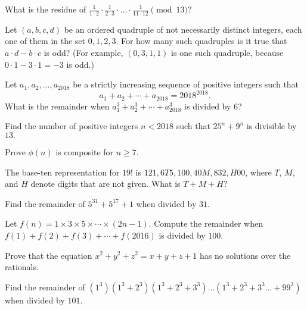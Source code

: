 \documentclass[mast]{lucky}
\begin{document}
\begin{prob}[]{2}
What is the residue of $\frac{1}{1\cdot 2}\cdot \frac{1}{2\cdot 3}\cdot \dots \cdot \frac{1}{11\cdot 12}\pmod {13}?$
\end{prob}

\begin{req}[AMC 10A 2020/18]{2}
Let $(a,b,c,d)$ be an ordered quadruple of not necessarily distinct integers, each one of them in the set ${0,1,2,3}.$ For how many such quadruples is it true that $a\cdot d-b\cdot c$ is odd? (For example, $(0,3,1,1)$ is one such quadruple, because $0\cdot 1-3\cdot 1 = -3$ is odd.)
\end{req}

\begin{prob}[AMC 10B 2018/16]{3}
Let $a_1,a_2,\dots,a_{2018}$ be a strictly increasing sequence of positive integers such that\[a_1+a_2+\cdots+a_{2018}=2018^{2018}.\]What is the remainder when $a_1^3+a_2^3+\cdots+a_{2018}^3$ is divided by $6$?
\end{prob}

\begin{prob}[PUMaC 2018]{3}
Find the number of positive integers $n<2018$ such that $25^n+9^n$ is divisible by $13.$
\end{prob}

\begin{prob}[]{3}
Prove $\phi(n)$ is composite for $n\geq 7.$
\end{prob}

\begin{prob}[AMC 10B 2019/14]{3}
The base-ten representation for $19!$ is $121,6T5,100,40M,832,H00$, where $T$, $M$, and $H$ denote digits that are not given. What is $T+M+H$?
\end{prob}
    
\begin{prob}[]{4}
Find the remainder of $5^{31}+5^{17}+1$ when divided by $31.$
\end{prob}

\begin{prob}{4}
Let $f(n)=1 \times 3 \times 5 \times \cdots \times (2n-1)$. Compute the remainder when $f(1)+f(2)+f(3)+\cdots +f(2016)$ is divided by $100.$
\end{prob}

\begin{prob}[]{4}
Prove that the equation $x^2+y^2+z^2=x+y+z+1$ has no solutions over the rationals.
\end{prob}

\begin{req}{4}
Find the remainder of $(1^3)(1^3+2^3)(1^3+2^3+3^3)\dots(1^3+2^3+3^3\dots+99^3)$ when divided by $101.$
\end{req}
\end{document}
